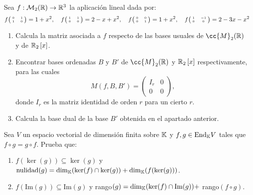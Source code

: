 \documentclass[12pt]{article}
\begin{document}
	\begin{ejercicio}[2.5 puntos] Sea $f : \mathcal{M}_2({\mathbb{R}}) \rightarrow {\mathbb{R}}^3$ la aplicación lineal dada por:
		\begin{equation*}
			f{\tiny \begin{pmatrix}
				\ 0 & 1 \ \\
				\ 1 & 0 \ \\
			\end{pmatrix}} = 1+x^2, \quad
			f{\tiny \begin{pmatrix}
				\ 1 & 1 \ \\
				\ 0 & 0 \ \\
			\end{pmatrix}} = 2-x+x^2, \quad	
			f{\tiny \begin{pmatrix}
				\ 0 & 0 \ \\
				\ 0 & 1 \ \\
			\end{pmatrix}} = 1+x^2, \quad
			f{\tiny \begin{pmatrix}
				\ 1 & -1 \ \\
				\ 0 & 0 \ \\
			\end{pmatrix}} =2-3x-x^2										
		\end{equation*}
		
		\begin{enumerate} 
			\item Calcula la matriz asociada a $f$ respecto de las bases usuales de $\cc{M}_2(\R)$ y de ${\mathbb{R}}_2\left[x\right]$.
			\item Encontrar bases ordenadas $B$ y $B'$ de $\cc{M}_2(\R)$ y ${\mathbb{R}}_2\left[x\right]$ respectivamente, para las cuales
			\[
			M(f, B, B') = 
			\left(
				\begin{array}{c|c}
					I_r & 0 \\
					\hline
					0 & 0
				\end{array}
			\right)
			,
			\]
			donde $I_r$ es la matriz identidad de orden $r$ para un cierto $r$.
			\item Calcula la base dual de la base $B'$ obtenida en el apartado anterior.
		\end{enumerate}
	\end{ejercicio}	
	
	\begin{ejercicio}[2.5 puntos] Sea $V$ un espacio vectorial de dimensión finita sobre ${\mathbb{K}}$ y $f,g \in \text{End}_{{\mathbb{K}}}V$ tales que $f \circ g = g \circ f$. Prueba que:
		
		\begin{enumerate} 
			\item $f( \ker(g)) \subseteq  \ker(g)$ y $\text{nulidad}(g) = \dim_{{\mathbb{K}}}( \ker(f) \cap  \ker(g)) + \dim_{{\mathbb{K}}}(f( \ker(g)))$.
			\item $f(\text{Im}(g)) \subseteq \text{Im}(g)$ y rango$(g) = \dim_{{\mathbb{K}}}( \ker(f) \cap \text{Im}(g)) +$ rango$(f \circ g)$.
		\end{enumerate}
	\end{ejercicio}
	
\end{document}
